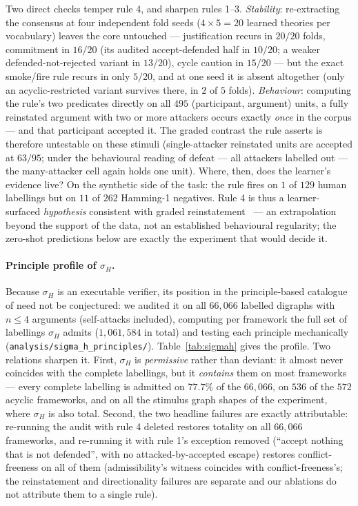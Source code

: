 \documentclass[review,12pt]{elsarticle}
\theoremstyle{definition}
\theoremstyle{remark}
\newcommand{\pred}[1]{\textsf{#1}}
\begin{document}
Two direct checks temper rule 4, and sharpen rules 1--3. \emph{Stability}:
re-extracting the consensus at four independent fold seeds ($4\times5=20$
learned theories per vocabulary) leaves the core untouched --- justification
recurs in $20/20$ folds, commitment in $16/20$ (its audited accept-defended
half in $10/20$; a weaker defended-not-rejected variant in $13/20$), cycle
caution in $15/20$ --- but the exact smoke/fire rule recurs
in only $5/20$, and at one seed it is absent altogether (only an
acyclic-restricted variant survives there, in $2$ of $5$ folds).
\emph{Behaviour}: computing the rule's two predicates directly on all $495$
(participant, argument) units, a fully reinstated argument with two or more
attackers occurs exactly \emph{once} in the corpus --- and that participant
accepted it. The graded contrast the rule asserts is therefore untestable on
these stimuli (single-attacker reinstated units are accepted at $63/95$;
under the behavioural reading of defeat --- all attackers labelled
\pred{out} --- the many-attacker cell again holds one unit). Where, then,
does the learner's evidence live? On the synthetic side of the task: the rule
fires on $1$ of $129$ human labellings but on $11$ of $262$ Hamming-1
negatives. Rule 4 is thus a learner-surfaced \emph{hypothesis} consistent
with graded reinstatement~\citep{rahwan2010,grossi2019graded} --- an
extrapolation beyond the support of the data, not an established behavioural
regularity; the zero-shot predictions below are exactly the experiment that
would decide it.

\paragraph{Principle profile of $\sigma_H$.}
Because $\sigma_H$ is an executable verifier, its position in the
principle-based catalogue of \citet{baroni2011} need not be conjectured: we
audited it on all $66{,}066$ labelled digraphs with $n\le4$ arguments
(self-attacks included), computing per framework the full set of labellings
$\sigma_H$ admits ($1{,}061{,}584$ in total) and testing each principle
mechanically (\texttt{analysis/sigma\_h\_principles/}).
Table~\ref{tab:sigmah} gives the profile. Two relations sharpen it. First,
$\sigma_H$ is \emph{permissive} rather than deviant: it almost never
coincides with the complete labellings, but it \emph{contains} them on most
frameworks --- every complete labelling is admitted on $77.7\%$ of the
$66{,}066$, on $536$ of the $572$ acyclic frameworks, and on all the stimulus
graph shapes of the experiment, where $\sigma_H$ is also total. Second, the two
headline failures are exactly attributable: re-running the audit with rule 4
deleted restores totality on all $66{,}066$ frameworks, and re-running it
with rule 1's exception removed (``accept nothing that is not defended'',
with no attacked-by-accepted escape) restores conflict-freeness on all of
them (admissibility's witness coincides with conflict-freeness's; the
reinstatement and directionality failures are separate and our ablations do
not attribute them to a single rule).
\end{document}
